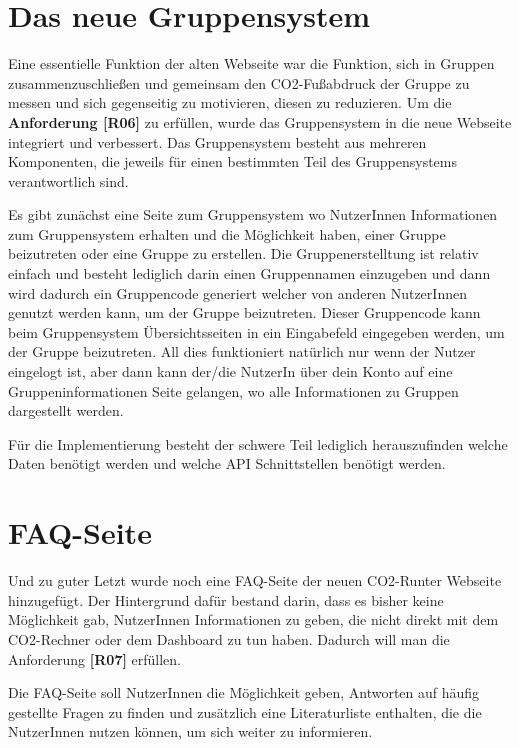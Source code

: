 \section{Das neue Gruppensystem}

Eine essentielle Funktion der alten Webseite war die Funktion, sich in Gruppen zusammenzuschließen und gemeinsam den CO2-Fußabdruck der Gruppe zu messen und sich gegenseitig zu motivieren, diesen zu reduzieren. Um die \textbf{Anforderung [R06]} zu erfüllen, wurde das Gruppensystem in die neue Webseite integriert und verbessert. Das Gruppensystem besteht aus mehreren Komponenten, die jeweils für einen bestimmten Teil des Gruppensystems verantwortlich sind.

Es gibt zunächst eine Seite zum Gruppensystem wo NutzerInnen Informationen zum Gruppensystem erhalten und die Möglichkeit haben, einer Gruppe beizutreten oder eine Gruppe zu erstellen. Die Gruppenerstelltung ist relativ einfach und besteht lediglich darin einen Gruppennamen einzugeben und dann wird dadurch ein Gruppencode generiert welcher von anderen NutzerInnen genutzt werden kann, um der Gruppe beizutreten. Dieser Gruppencode kann beim Gruppensystem Übersichtsseiten in ein Eingabefeld eingegeben werden, um der Gruppe beizutreten. All dies funktioniert natürlich nur wenn der Nutzer eingelogt ist, aber dann kann der/die NutzerIn über dein Konto auf eine Gruppeninformationen Seite gelangen, wo alle Informationen zu Gruppen dargestellt werden.

Für die Implementierung besteht der schwere Teil lediglich herauszufinden welche Daten benötigt werden und welche \acs{API} Schnittstellen benötigt werden.



\section{FAQ-Seite}

Und zu guter Letzt wurde noch eine FAQ-Seite der neuen CO2-Runter Webseite hinzugefügt. Der Hintergrund dafür bestand darin, dass es bisher keine Möglichkeit gab, NutzerInnen Informationen zu geben, die nicht direkt mit dem CO2-Rechner oder dem Dashboard zu tun haben. Dadurch will man die Anforderung \textbf{[R07]} erfüllen.

Die FAQ-Seite soll NutzerInnen die Möglichkeit geben, Antworten auf häufig gestellte Fragen zu finden und zusätzlich eine Literaturliste enthalten, die die NutzerInnen nutzen können, um sich weiter zu informieren.

